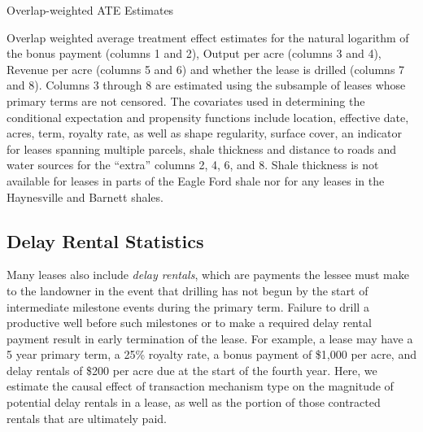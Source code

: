 \documentclass[12pt]{article}
\begin{document}
\begin{appendices}
\addtolength{\tabcolsep}{1pt}
\begin{table}[H]
\begin{center}
\begin{threeparttable}
	\caption{Overlap-weighted ATE Estimates}
	\label{tab:causal_forests}
 	\small
   	            
    \footnotesize
    \begin{tablenotes}
    	\item Overlap weighted average treatment effect estimates for the natural logarithm of the bonus payment (columns 1 and 2), Output per acre (columns 3 and 4), Revenue per acre (columns 5 and 6) and whether the lease is drilled (columns 7 and 8).  Columns 3 through 8 are estimated using the subsample of leases whose primary terms are not censored.  The covariates used in determining the conditional expectation and propensity functions include location, effective date, acres, term, royalty rate, as well as shape regularity, surface cover, an indicator for leases spanning multiple parcels, shale thickness and distance to roads and water sources for the ``extra'' columns 2, 4, 6, and 8.  Shale thickness is not available for leases in parts of the Eagle Ford shale nor for any leases in the Haynesville and Barnett shales.
    \end{tablenotes}
\end{threeparttable}
\end{center}
\end{table}	
\addtolength{\tabcolsep}{-1pt}

\subsection{Delay Rental Statistics \label{sec:delay_rentals}}
Many leases also include \textit{delay rentals}, which are payments the lessee must make to the landowner in the event that drilling has not begun by the start of intermediate milestone events during the primary term.  Failure to drill a productive well before such milestones or to make a required delay rental payment result in early termination of the lease.  For example, a lease may have a 5 year primary term, a 25\% royalty rate, a bonus payment of \$1,000 per acre, and delay rentals of \$200 per acre due at the start of the fourth year.  Here, we estimate the causal effect of transaction mechanism type on the magnitude of potential delay rentals in a lease, as well as the portion of those contracted rentals that are ultimately paid. 


\end{appendices}
\end{document}
